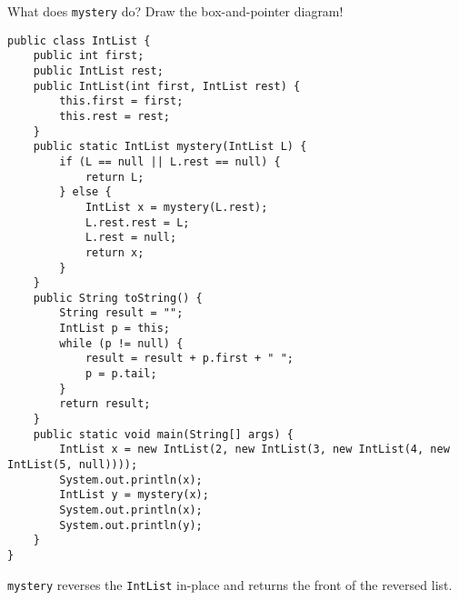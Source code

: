 \begin{blocksection}
\question What does \lstinline$mystery$ do? Draw the box-and-pointer diagram!

\begin{lstlisting}
public class IntList {
    public int first;
    public IntList rest;
    public IntList(int first, IntList rest) {
        this.first = first;
        this.rest = rest;
    }
    public static IntList mystery(IntList L) {
        if (L == null || L.rest == null) {
            return L;
        } else {
            IntList x = mystery(L.rest);
            L.rest.rest = L;
            L.rest = null;
            return x;
        }
    }
    public String toString() {
        String result = "";
        IntList p = this;
        while (p != null) {
            result = result + p.first + " ";
            p = p.tail;
        }
        return result;
    }
    public static void main(String[] args) {
        IntList x = new IntList(2, new IntList(3, new IntList(4, new IntList(5, null))));
        System.out.println(x);
        IntList y = mystery(x);
        System.out.println(x);
        System.out.println(y);
    }
}
\end{lstlisting}


\end{blocksection}

\begin{solution}
\pagebreak
\clearpage
\lstinline$mystery$ reverses the \lstinline$IntList$ in-place and returns the
front of the reversed list.

\clearpage
\pagebreak

\end{solution}
